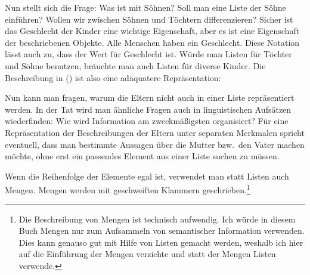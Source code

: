 \noindent
Nun stellt sich die Frage: Was ist mit Söhnen? Soll man eine Liste der Söhne einführen?
Wollen wir zwischen Söhnen und Töchtern differenzieren? 
Sicher ist das Geschlecht der Kinder eine wichtige Eigenschaft, aber es ist eine Eigenschaft
der beschriebenen Objekte. Alle Menschen haben ein Geschlecht. Diese Notation lässt auch zu, dass
der Wert für Geschlecht  ist. Würde man Listen für Töchter und Söhne benutzen, bräuchte
man auch Listen für diverse Kinder. Die Beschreibung in ()
ist also eine adäquatere Repräsentation:

\ea
{}
\z
Nun kann man fragen, warum die Eltern nicht auch in einer Liste repräsentiert werden.
In der Tat wird man ähnliche Fragen auch in linguistischen Aufsätzen wiederfinden:
Wie wird Information am zweckmäßigsten organisiert? Für eine Repräsentation der Beschreibungen
der Eltern unter separaten Merkmalen spricht eventuell, dass man bestimmte Aussagen über die
Mutter bzw.\ den Vater machen möchte, ohne erst ein passendes Element aus einer Liste suchen
zu müssen.

Wenn die Reihenfolge der Elemente egal ist, verwendet man statt Listen auch Mengen.
Mengen werden mit geschweiften Klammern geschrieben.\footnote{
 Die Beschreibung von Mengen ist technisch aufwendig.
 Ich würde in diesem Buch Mengen nur zum Aufsammeln von semantischer Information verwenden.
 Dies kann genauso gut mit Hilfe von Listen gemacht werden, weshalb ich hier auf die
 Einführung der Mengen verzichte und statt der Mengen Listen verwende.%
}

